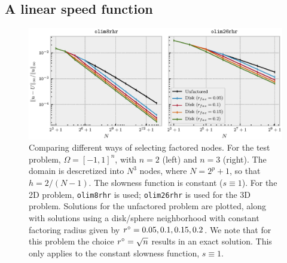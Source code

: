 \documentclass[sisc-eikonal.tex]{subfiles}
\begin{document}
\subsection{A linear speed function}\label{ssec:slotnick}

\begin{figure}
  \centering
  \includegraphics[width=\linewidth]{factoring-error-example.eps}%
  \vspace{-1.4em}
  \caption{Comparing different ways of selecting factored nodes. For
    the test problem, $\Omega = [-1, 1]^n$, with $n = 2$ (left) and
    $n = 3$ (right). The domain is descretized into $N^3$ nodes, where
    $N = 2^p + 1$, so that $h = 2/(N - 1)$. The slowness function is
    constant ($s \equiv 1$). For the 2D problem, \texttt{olim8rhr} is
    used; \texttt{olim26rhr} is used for the 3D problem. Solutions for
    the unfactored problem are plotted, along with solutions using a
    disk/sphere neighborhood with constant factoring radius given by
    $r^\circ = 0.05, 0.1, 0.15, 0.2$. We note that for this problem the
    choice $r^\circ = \sqrt{n}$ results in an exact solution. This only
    applies to the constant slowness function, $s \equiv 1$.
  }\label{fig:factoring-error-example}
\end{figure}
\end{document}
